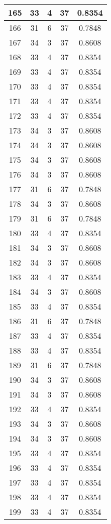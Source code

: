 \documentclass[letterpaper, 12pt]{article}
\begin{document}
\begin{longtable}{|c|c|c|c|c|}
\hline
165 & 33 & 4 & 37 & 0.8354 \\
\hline
166 & 31 & 6 & 37 & 0.7848 \\
\hline
167 & 34 & 3 & 37 & 0.8608 \\
\hline
168 & 33 & 4 & 37 & 0.8354 \\
\hline
169 & 33 & 4 & 37 & 0.8354 \\
\hline
170 & 33 & 4 & 37 & 0.8354 \\
\hline
171 & 33 & 4 & 37 & 0.8354 \\
\hline
172 & 33 & 4 & 37 & 0.8354 \\
\hline
173 & 34 & 3 & 37 & 0.8608 \\
\hline
174 & 34 & 3 & 37 & 0.8608 \\
\hline
175 & 34 & 3 & 37 & 0.8608 \\
\hline
176 & 34 & 3 & 37 & 0.8608 \\
\hline
177 & 31 & 6 & 37 & 0.7848 \\
\hline
178 & 34 & 3 & 37 & 0.8608 \\
\hline
179 & 31 & 6 & 37 & 0.7848 \\
\hline
180 & 33 & 4 & 37 & 0.8354 \\
\hline
181 & 34 & 3 & 37 & 0.8608 \\
\hline
182 & 34 & 3 & 37 & 0.8608 \\
\hline
183 & 33 & 4 & 37 & 0.8354 \\
\hline
184 & 34 & 3 & 37 & 0.8608 \\
\hline
185 & 33 & 4 & 37 & 0.8354 \\
\hline
186 & 31 & 6 & 37 & 0.7848 \\
\hline
187 & 33 & 4 & 37 & 0.8354 \\
\hline
188 & 33 & 4 & 37 & 0.8354 \\
\hline
189 & 31 & 6 & 37 & 0.7848 \\
\hline
190 & 34 & 3 & 37 & 0.8608 \\
\hline
191 & 34 & 3 & 37 & 0.8608 \\
\hline
192 & 33 & 4 & 37 & 0.8354 \\
\hline
193 & 34 & 3 & 37 & 0.8608 \\
\hline
194 & 34 & 3 & 37 & 0.8608 \\
\hline
195 & 33 & 4 & 37 & 0.8354 \\
\hline
196 & 33 & 4 & 37 & 0.8354 \\
\hline
197 & 33 & 4 & 37 & 0.8354 \\
\hline
198 & 33 & 4 & 37 & 0.8354 \\
\hline
199 & 33 & 4 & 37 & 0.8354 \\
\hline
\end{longtable}
\end{document}
